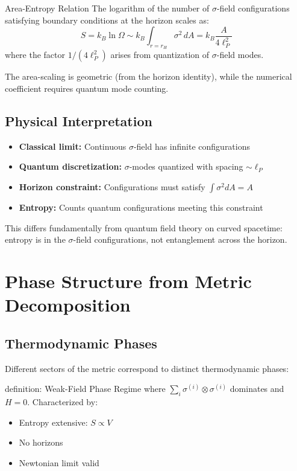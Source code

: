 \documentclass[11pt,a4paper]{article}
\theoremstyle{definition}
\theoremstyle{remark}
\begin{document}
	Area-Entropy Relation
		The logarithm of the number of $\sigma$-field configurations satisfying boundary conditions at the horizon scales as:
		\begin{equation}
			S = k_B \ln \Omega \sim k_B \int_{r=r_H} \sigma^2 \, dA = k_B \frac{A}{4\ell_P^2}
		\end{equation}
		where the factor $1/(4\ell_P^2)$ arises from quantization of $\sigma$-field modes.
	
	The area-scaling is geometric (from the horizon identity), while the numerical coefficient requires quantum mode counting.
	
	\subsection{Physical Interpretation}
	
	\begin{itemize}
		\item \textbf{Classical limit:} Continuous $\sigma$-field has infinite configurations
		\item \textbf{Quantum discretization:} $\sigma$-modes quantized with spacing $\sim \ell_P$
		\item \textbf{Horizon constraint:} Configurations must satisfy $\int \sigma^2 dA = A$
		\item \textbf{Entropy:} Counts quantum configurations meeting this constraint
	\end{itemize}
	
	This differs fundamentally from quantum field theory on curved spacetime: entropy is in the $\sigma$-field configurations, not entanglement across the horizon.
	
	\section{Phase Structure from Metric Decomposition}
	
	\subsection{Thermodynamic Phases}
	
	Different sectors of the metric correspond to distinct thermodynamic phases:
	
	definition: Weak-Field Phase
		Regime where $\sum_i \sigma^{(i)} \otimes \sigma^{(i)}$ dominates and $H = 0$. Characterized by:
		\begin{itemize}
			\item Entropy extensive: $S \propto V$
			\item No horizons
			\item Newtonian limit valid
		\end{itemize}
	
\end{document}
